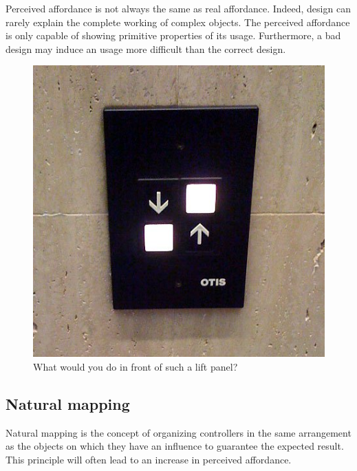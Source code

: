 \documentclass[a4paper,11pt] {article}
\theoremstyle{definition}
\begin{document}
Perceived affordance is not always the same as real affordance. Indeed, design can rarely explain the complete working of complex objects. The perceived affordance is only capable of showing primitive properties of its usage. Furthermore, a bad design may induce an usage more difficult than the correct design\cite{affordancesMads}.

\begin{figure}[h]
\centering
\includegraphics[scale=0.20]{fig-report/bad-switches.jpg}
\caption{What would you do in front of such a lift panel?}
\end{figure}

    \subsection{Natural mapping}
Natural mapping is the concept of organizing controllers in the same arrangement as the objects on which they have an influence to guarantee the expected result. This principle will often lead to an increase in perceived affordance.\\
\end{document}
